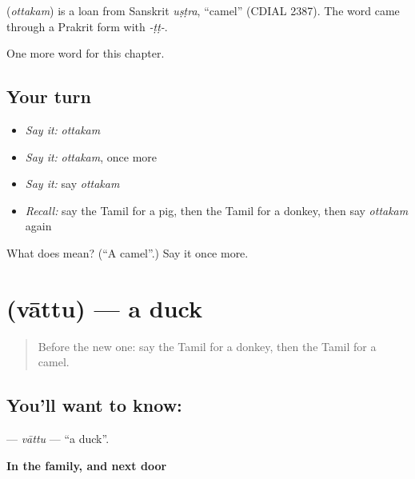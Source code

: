 \begin{cousinweb}
\textbf{} (\emph{ottakam}) is a loan from Sanskrit \emph{uṣṭra}, \textquotedblleft{}camel\textquotedblright{} (CDIAL 2387). The word came through a Prakrit form with \emph{-ṭṭ-}.
\end{cousinweb}

\begin{grammarlens}[title={What you've built}]
One more word for this chapter.
\end{grammarlens}

\subsection*{Your turn}
\begin{itemize}
\raggedright
  \item \emph{Say it:} \emph{ottakam}
  \item \emph{Say it:} \emph{ottakam}, once more
  \item \emph{Say it:} say \emph{ottakam}
  \item \emph{Recall:} say the Tamil for a pig, then the Tamil for a donkey, then say \emph{ottakam} again
\end{itemize}

\begin{tcolorbox}[breakable,colback=teal!4,colframe=teal!35!black,title={Before you move on}]
What does  mean? (\textquotedblleft{}A camel\textquotedblright{}.) Say it once more.
\end{tcolorbox}
\section[\texorpdfstring{\ta{வாத்து} (vāttu)}{வாத்து (vāttu)}]{ (vāttu) — a duck}

\label{lesson:TA-C142-vattu}



\begin{quote}
Before the new one: say the Tamil for a donkey, then the Tamil for a camel.
\end{quote}

\subsection*{You'll want to know: }
\textbf{} — \emph{vāttu} — \textquotedblleft{}a duck\textquotedblright{}.

\textbf{In the family, and next door}

